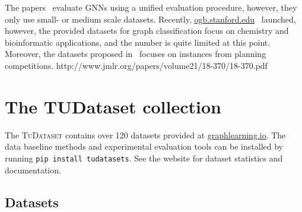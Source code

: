 \documentclass{article}
\theoremstyle{definition}
\begin{document}
The papers~\cite{Fey+2019,Che+2019,Err+2019,Dwi+2020} evaluate GNNs using a unified evaluation procedure, however, they only use small- or medium scale datasets. Recently, \url{ogb.stanford.edu}~\cite{Hu+2020} launched, however, the provided datasets for graph classification focus on chemistry and bioinformatic applications, and the number is quite limited at this point. Moreover, the datasets proposed in~\cite{Fer+2019} focuses on instances from planning competitions. http://www.jmlr.org/papers/volume21/18-370/18-370.pdf

\section{The TUDataset collection}

The \textsc{TuDataset} contains over 120 datasets provided at \url{graphlearning.io}. The data baseline methods and experimental evaluation tools can be installed by running \texttt{pip install tudatasets}. See the website for dataset statistics and documentation.

\subsection{Datasets}
\end{document}
